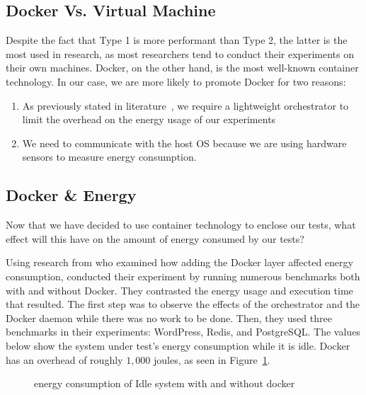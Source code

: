 \subsection{Docker Vs. Virtual Machine}
Despite the fact that Type 1 is more performant than Type 2, the latter is the most used in research, as most researchers tend to conduct their experiments on their own machines. Docker, on the other hand, is the most well-known container technology. In our case, we are more likely to promote Docker for two reasons:
\begin{enumerate}
    \item As previously stated in literature~\cite{van2016power,morabito_power_2015}, we require a lightweight orchestrator to limit the overhead on the energy usage of our experiments
    \item We need to communicate with the host OS because we are using hardware sensors to measure energy consumption.
\end{enumerate}



\subsection{Docker \& Energy}
Now that we have decided to use container technology to enclose our tests, what effect will this have on the amount of energy consumed by our tests?


Using research from \cite{eddie_antonio_santos_how} who examined how adding the Docker layer affected energy consumption, \citeauthor{eddie_antonio_santos_how} conducted their experiment by running numerous benchmarks both with and without Docker. They contrasted the energy usage and execution time that resulted.
The first step was to observe the effects of the orchestrator and the Docker daemon while there was no work to be done.
Then, they used three benchmarks in their experiments: WordPress, Redis, and PostgreSQL.
The values below show the system under test's energy consumption while it is idle.
Docker has an overhead of roughly $1,000$  joules, as seen in Figure~\ref{fig:docker_idle}.


\begin{figure}
    \caption{energy consumption of Idle system with and without docker \cite{eddie_antonio_santos_how}}\label{fig:docker_idle}
\end{figure}

